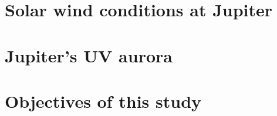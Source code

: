 \section{Solar wind conditions at Jupiter}

\section{Jupiter's UV aurora}

\section{Objectives of this study}



